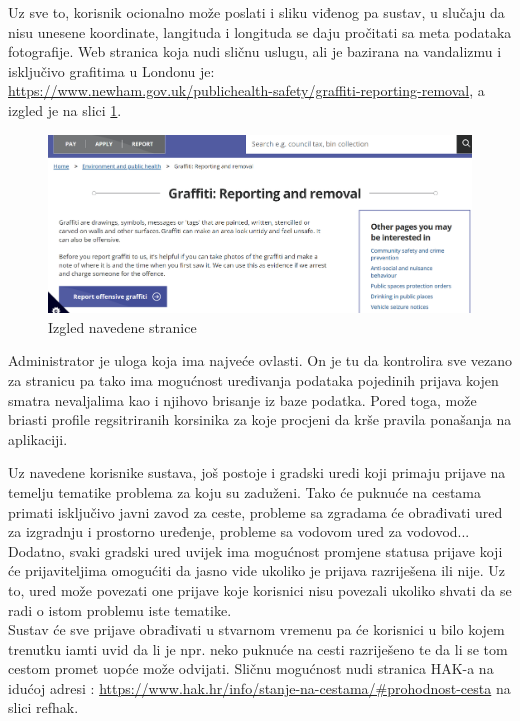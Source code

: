 			Uz sve to, korisnik ocionalno može poslati i sliku viđenog pa sustav, u slučaju da nisu unesene koordinate, langituda i longituda se daju pročitati sa meta podataka fotografije. Web stranica koja  nudi sličnu uslugu, ali je bazirana na vandalizmu i isključivo grafitima u Londonu je: \\ \url{https://www.newham.gov.uk/publichealth-safety/graffiti-reporting-removal}, a izgled je na slici \ref{fig:promjene}.\\
			
			\begin{figure}[H]
			\includegraphics[scale=0.4]{slike/simular_page.PNG} %
			\centering
			\caption{Izgled navedene stranice}
			\label{fig:promjene}
		\end{figure}
		
		Administrator je uloga koja ima najveće ovlasti. On je tu da kontrolira sve vezano za stranicu pa tako ima mogućnost uređivanja podataka pojedinih prijava kojen smatra nevaljalima kao i njihovo brisanje iz baze podatka. Pored toga, može briasti profile regsitriranih korsinika za koje procjeni da krše pravila ponašanja na aplikaciji. 
		
		Uz navedene korisnike sustava, još postoje i gradski uredi koji primaju prijave na temelju tematike problema za koju su zaduženi. Tako će puknuće na cestama primati isključivo javni zavod za ceste, probleme sa zgradama će obrađivati ured za izgradnju i prostorno uređenje, probleme sa vodovom ured za vodovod...  Dodatno, svaki gradski ured uvijek ima mogućnost  promjene statusa prijave koji će prijaviteljima omogućiti da jasno vide ukoliko je prijava razriješena ili nije. Uz to, ured može povezati one prijave koje korisnici nisu povezali ukoliko shvati da se radi o istom problemu iste tematike.\\
		
		Sustav će sve prijave obrađivati u stvarnom vremenu pa će korisnici u bilo kojem trenutku iamti uvid da li je npr. neko puknuće na cesti razriješeno te da li se tom cestom promet uopće može odvijati. Sličnu mogućnost nudi stranica HAK-a na idućoj adresi : \url{https://www.hak.hr/info/stanje-na-cestama/#prohodnost-cesta} na slici ref{hak}.\\
		
